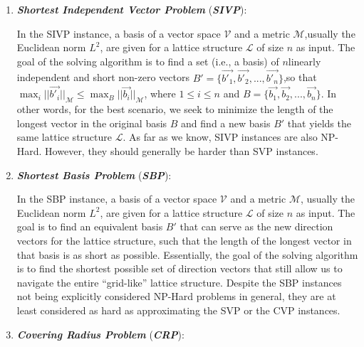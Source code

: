 \documentclass[runningheads]{llncs}
\numberwithin{equation}{section}
\begin{document}
\begin{enumerate}
        \item \textbf{\textit{Shortest Independent Vector Problem}} (\textbf{\textit{SIVP}}):
        \vspace{0.6ex}

        In the SIVP instance, a basis of a vector space $\mathcal{V}$ and a metric $\mathcal{M}$,\break usually the Euclidean norm ${L}^{2}$, are given for a lattice structure $\mathcal{L}$ of size $n$ as input. The goal of the solving algorithm is to find a set (i.e., a basis) of $n$\break linearly independent and short non-zero vectors $B' = \{ \Vec{{b'}_{1}}, \Vec{{b'}_{2}}, ..., \Vec{{b'}_{n}} \}$,\break so that ${\max}_{i} {||\Vec{{b'}_{i}}||}_{\mathcal{M}} \leq {\max}_{B} {||\Vec{{b}_{i}}||}_{\mathcal{M}}$, where $1 \leq i \leq n$ and $B = \{ \Vec{{b}_{1}}, \Vec{{b}_{2}}, ..., \Vec{{b}_{n}} \}$. In other words, for the best scenario, we seek to minimize the length of the longest vector in the original basis $B$ and find a new basis $B'$ that yields the same lattice structure $\mathcal{L}$. As far as we know, SIVP instances are also NP-Hard. However, they should generally be harder than SVP instances.
        \vspace{2ex}

        \item \textbf{\textit{Shortest Basis Problem}} (\textbf{\textit{SBP}}):
        \vspace{0.6ex}
        
        In the SBP instance, a basis of a vector space $\mathcal{V}$ and a metric $\mathcal{M}$, usually the Euclidean norm ${L}^{2}$, are given for a lattice structure $\mathcal{L}$ of size $n$ as input. The goal is to find an equivalent basis $B'$ that can serve as the new direction vectors for the lattice structure, such that the length of the longest vector in that basis is as short as possible. Essentially, the goal of the solving algorithm is to find the shortest possible set of direction vectors that still allow us to navigate the entire ``grid-like'' lattice structure. Despite the SBP instances not being explicitly considered NP-Hard problems in general, they are at least considered as hard as approximating the SVP or the CVP instances.
        \vspace{2ex}

        \item \textbf{\textit{Covering Radius Problem}} (\textbf{\textit{CRP}}):
        \vspace{0.6ex}


\end{enumerate}
\end{document}
